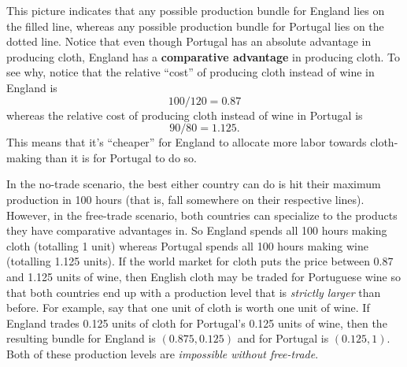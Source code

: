 \documentclass{article}
\begin{document}
This picture indicates that any possible production bundle for England lies on the filled line,
whereas any possible production bundle for Portugal lies on the dotted line.  Notice that even
though Portugal has an absolute advantage in producing cloth, England has a \textbf{comparative
advantage} in producing cloth. To see why, notice that the relative ``cost'' of producing cloth
instead of wine in England is 
\begin{equation*}
  100 / 120 = 0.87
\end{equation*}
whereas the relative cost of producing cloth instead of wine in Portugal is
\begin{equation*}
  90 / 80 = 1.125.
\end{equation*}
This means that it's ``cheaper'' for England to allocate more labor towards cloth-making than it is
for Portugal to do so. 

In the no-trade scenario, the best either country can do is hit their maximum production in 100
hours (that is, fall somewhere on their respective lines). However, in the free-trade scenario, both
countries can specialize to the products they have comparative advantages in. So England spends all
100 hours making cloth (totalling 1 unit) whereas Portugal spends all 100 hours making wine
(totalling 1.125 units). If the world market for cloth puts the price between 0.87 and 1.125 units
of wine, then English cloth may be traded for Portuguese wine so that both countries end up with a
production level that is \emph{strictly larger} than before. For example, say that one unit of cloth
is worth one unit of wine. If England trades 0.125 units of cloth for Portugal's 0.125 units of
wine, then the resulting bundle for England is $(0.875,0.125)$ and for Portugal is $(0.125, 1)$.
Both of these production levels are \emph{impossible without free-trade}. 
\end{document}
